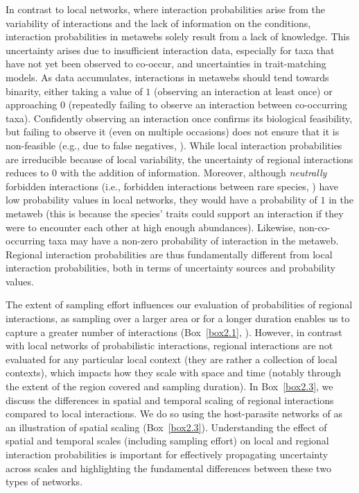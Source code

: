 In contrast to local networks, where interaction probabilities arise from the
variability of interactions and the lack of information on the conditions,
interaction probabilities in metawebs solely result from a lack of knowledge.
This uncertainty arises due to insufficient interaction data, especially for
taxa that have not yet been observed to co-occur, and uncertainties in
trait-matching models. As data accumulates, interactions in metawebs should tend
towards binarity, either taking a value of $1$ (observing an interaction at
least once) or approaching $0$ (repeatedly failing to observe an interaction
between co-occurring taxa). Confidently observing an interaction once confirms
its biological feasibility, but failing to observe it (even on multiple
occasions) does not ensure that it is non-feasible (e.g., due to false
negatives, \cite{Catchen2023Missinga}). While local interaction probabilities
are irreducible because of local variability, the uncertainty of regional
interactions reduces to $0$ with the addition of information. Moreover, although
\textit{neutrally} forbidden interactions (i.e., forbidden interactions between
rare species, \cite{Canard2012Emergence}) have low probability values in local
networks, they would have a probability of $1$ in the metaweb (this is because
the species' traits could support an interaction if they were to encounter each
other at high enough abundances). Likewise, non-co-occurring taxa may have a
non-zero probability of interaction in the metaweb. Regional interaction
probabilities are thus fundamentally different from local interaction
probabilities, both in terms of uncertainty sources and probability values.

The extent of sampling effort influences our evaluation of probabilities of
regional interactions, as sampling over a larger area or for a longer duration
enables us to capture a greater number of interactions (Box~\ref{box2.1},
\cite{McLeod2021Sampling}). However, in contrast with local networks of
probabilistic interactions, regional interactions are not evaluated for any
particular local context (they are rather a collection of local contexts), which
impacts how they scale with space and time (notably through the extent of the
region covered and sampling duration). In Box~\ref{box2.3}, we discuss the
differences in spatial and temporal scaling of regional interactions compared to
local interactions. We do so using the host-parasite networks of
\textcite{Kopelke2017Foodweb} as an illustration of spatial scaling
(Box~\ref{box2.3}). Understanding the effect of spatial and temporal scales
(including sampling effort) on local and regional interaction probabilities is
important for effectively propagating uncertainty across scales and highlighting
the fundamental differences between these two types of networks. 

